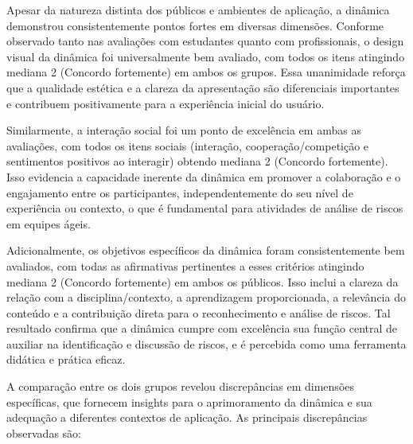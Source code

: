 \documentclass[
	12pt,
	openright,
	twoside,
	a4paper,
	english,
	brazil
	]{abntex2}
\begin{document}
Apesar da natureza distinta dos públicos e ambientes de aplicação, a dinâmica demonstrou consistentemente pontos fortes em diversas dimensões. Conforme observado tanto nas avaliações com estudantes quanto com profissionais, o design visual da dinâmica foi universalmente bem avaliado, com todos os itens atingindo mediana 2 (Concordo fortemente) em ambos os grupos. Essa unanimidade reforça que a qualidade estética e a clareza da apresentação são diferenciais importantes e contribuem positivamente para a experiência inicial do usuário.

Similarmente, a interação social foi um ponto de excelência em ambas as avaliações, com todos os itens sociais (interação, cooperação/competição e sentimentos positivos ao interagir) obtendo mediana 2 (Concordo fortemente). Isso evidencia a capacidade inerente da dinâmica em promover a colaboração e o engajamento entre os participantes, independentemente do seu nível de experiência ou contexto, o que é fundamental para atividades de análise de riscos em equipes ágeis.

Adicionalmente, os objetivos específicos da dinâmica foram consistentemente bem avaliados, com todas as afirmativas pertinentes a esses critérios atingindo mediana 2 (Concordo fortemente) em ambos os públicos. Isso inclui a clareza da relação com a disciplina/contexto, a aprendizagem proporcionada, a relevância do conteúdo e a contribuição direta para o reconhecimento e análise de riscos. Tal resultado confirma que a dinâmica cumpre com excelência sua função central de auxiliar na identificação e discussão de riscos, e é percebida como uma ferramenta didática e prática eficaz.

A comparação entre os dois grupos revelou discrepâncias em dimensões específicas, que fornecem insights para o aprimoramento da dinâmica e sua adequação a diferentes contextos de aplicação. As principais discrepâncias observadas são:
\end{document}
